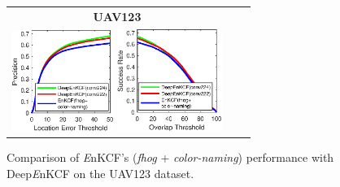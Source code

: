 \documentclass[10pt,twocolumn,letterpaper]{article}
\begin{document}

\begin{figure}[!h]
\centering
\begin{tabular}{ccc}
\tiny\quad\quad\textbf{UAV123}\\
\includegraphics[width=3.30cm]{./figures/pr_deep.eps}
\includegraphics[width=3.40cm]{./figures/sr_deep.eps}\\
\end{tabular}
\caption{Comparison of {\it E}nKCF's ({\it fhog} + {\it color-naming}) performance with Deep{\it E}nKCF on the UAV123
dataset.}
\label{fig:UAV123_DATASET_DeepFeatures}
\end{figure}

\end{document}
